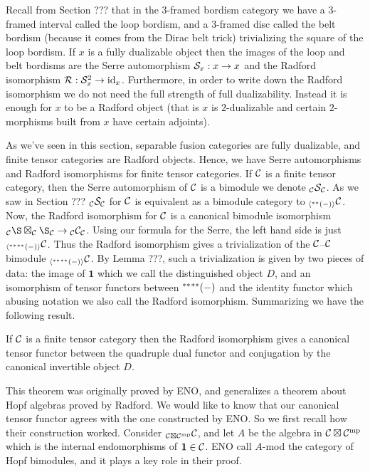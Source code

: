 \documentclass{amsart}
\begin{document}
Recall from Section ??? that in the $3$-framed bordism category we have a $3$-framed interval called the loop bordism, and a $3$-framed disc called the belt bordism (because it comes from the Dirac belt trick) trivializing the square of the loop bordism.  If $x$ is a fully dualizable object then the images of the loop and belt bordisms are the Serre automorphism $\mathcal S_x: x \rightarrow x$ and the Radford isomorphism $\mathcal R: \mathcal S_x^2 \rightarrow \mathrm{id}_x$.  Furthermore,  in order to write down the Radford isomorphism we do not need the full strength of full dualizability.  Instead it is enough for $x$ to be a Radford object (that is $x$ is $2$-dualizable and certain $2$-morphisms built from $x$ have certain adjoints).

As we've seen in this section, separable fusion categories are fully dualizable, and finite tensor categories are Radford objects.  Hence, we have Serre automorphisms and Radford isomorphisms for finite tensor categories.  If $\mathcal C$ is a finite tensor category, then the Serre automorphism of $\mathcal C$ is a bimodule we denote ${}_{\mathcal C} {\mathcal S}_{\mathcal C}$.  As we saw in Section ??? ${}_{\mathcal C} {\mathcal S}_{\mathcal C}$ for $\mathcal C$ is equivalent as a bimodule category to ${}_{\langle{}^{**}{(-)}\rangle} \mathcal C$.   Now, the Radford isomorphism for $\mathcal C$ is a canonical bimodule isomorphism ${}_\cC \S \boxtimes_\cC \S_\cC \rightarrow \bimod{\cC}{\cC}{\cC}$.  Using our formula for the Serre, the left hand side is just ${}_{\langle{}^{**}{{}^{**}{(-)}}\rangle} \mathcal C$.  Thus the Radford isomorphism gives a trivialization of the $\mathcal C$--$\mathcal C$ bimodule ${}_{\langle{}^{**}{{}^{**}{(-)}}\rangle} \mathcal C$.  By Lemma ???, such a trivialization is given by two pieces of data: the image of $\mathbf{1}$ which we call the distinguished object $D$, and an isomorphism of tensor functors between ${}^{**}{{}^{**}{(-)}}$ and the identity functor which abusing notation we also call the Radford isomorphism.  Summarizing we have the following result.

\begin{theorem}
If $\mathcal C$ is a finite tensor category then the Radford isomorphism gives a canonical tensor functor between the quadruple dual functor and conjugation by the canonical invertible object $D$.
\end{theorem}

This theorem was originally proved by ENO, and generalizes a theorem about Hopf algebras proved by Radford.  We would like to know that our canonical tensor functor agrees with the one constructed by ENO.  So we first recall how their construction worked.  Consider ${}_{\mathcal C \boxtimes \mathcal C^{\mathrm{mp}}}\mathcal C$, and let $A$ be the algebra in $\mathcal C \boxtimes \mathcal C^{\mathrm{mp}}$ which is the internal endomorphisms of $\mathbf{1} \in \mathcal C$.  ENO call $A$-mod the category of Hopf bimodules, and it plays a key role in their proof.
\end{document}
